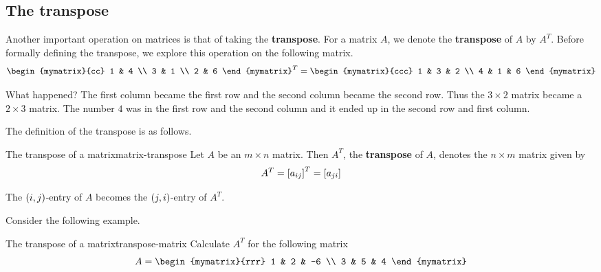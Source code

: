 \subsection{The transpose}

Another important operation on matrices is that of taking the \textbf{transpose}. For a matrix $A$, we denote the
\textbf{transpose} of $A$ by $A^T$. Before formally defining the transpose, we explore this
operation on the following matrix.
\begin{equation*}
\begin{mymatrix}{cc}
1 & 4 \\
3 & 1 \\
2 & 6
\end{mymatrix} ^{T}=\allowbreak \begin{mymatrix}{ccc}
1 & 3 & 2 \\
4 & 1 & 6
\end{mymatrix}
\end{equation*}

What happened? The first column became the first row and the second column
became the second row. Thus the $3\times 2$ matrix became a $2\times 3$
matrix. The number $4$ was in the first row and the second column and it
ended up in the second row and first column. 

The definition of the transpose is as follows.

\begin{definition}{The transpose of a matrix}{matrix-transpose}
Let $A$ be an $m\times n$ matrix. Then $A^{T}$, the \textbf{transpose} of $A$,  denotes the $n\times m$
matrix given by 
\begin{equation*}
A^{T} = \left[a _{ij}\right] ^{T}= \left[a_{ji} \right]
\end{equation*}
\end{definition}

The $\left(i, j  \right)$-entry of $A$ becomes the 
$\left(j,i \right)$-entry of $A^T$. 

Consider the following example.

\begin{example}{The transpose of a matrix}{transpose-matrix}
Calculate $A^T$ for the following matrix
\begin{equation*}
A = \begin{mymatrix}{rrr}
1 & 2 & -6 \\
3 & 5 & 4
\end{mymatrix}
\end{equation*}
\end{example}

